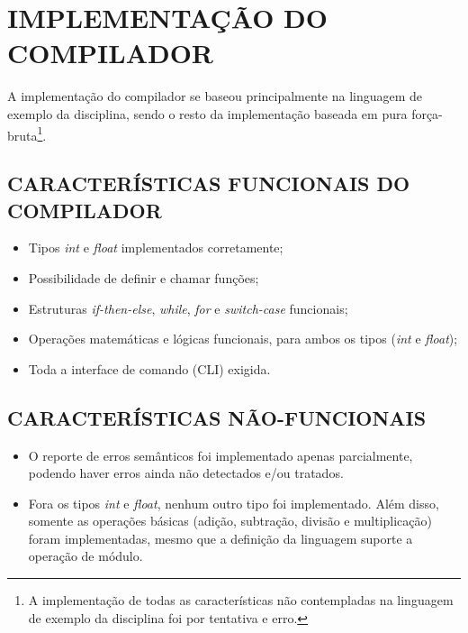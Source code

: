 \section{\normalsize IMPLEMENTAÇÃO DO COMPILADOR}
	A implementação do compilador se baseou principalmente na linguagem de exemplo da disciplina, sendo o resto da implementação baseada em pura força-bruta\footnote{A implementação de todas as características não contempladas na linguagem de exemplo da disciplina foi por tentativa e erro.}.
	
	\subsection{\normalsize CARACTERÍSTICAS FUNCIONAIS DO COMPILADOR}
	\begin{itemize}
		\item Tipos \textit{int} e \textit{float} implementados corretamente;
		\item Possibilidade de definir e chamar funções;
		\item Estruturas \textit{if-then-else}, \textit{while}, \textit{for} e \textit{switch-case} funcionais;
		\item Operações matemáticas e lógicas funcionais, para ambos os tipos (\textit{int} e \textit{float});
		\item Toda a interface de comando (CLI) exigida.
		
	\end{itemize}
	
	\subsection{\normalsize CARACTERÍSTICAS NÃO-FUNCIONAIS}
	\begin{itemize}
		\item O reporte de erros semânticos foi implementado apenas parcialmente, podendo haver erros ainda não detectados e/ou tratados.
		\item Fora os tipos \textit{int} e \textit{float}, nenhum outro tipo foi implementado. Além disso, somente as operações básicas (adição, subtração, divisão e multiplicação) foram implementadas, mesmo que a definição da linguagem suporte a operação de módulo.
	\end{itemize}
	
